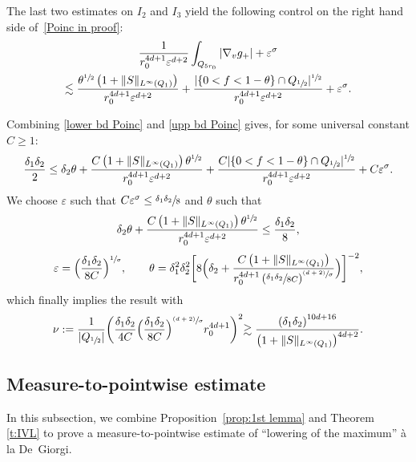 \documentclass[10pt]{amsart}
\newcommand{\psfrac}[2]{\sfrac{(#1)}{#2}}
\theoremstyle{definition}
\theoremstyle{remark}
\let\var\varepsilon
\begin{document}
The last two estimates on $I_2$ and $I_3$ yield the following
control on the right hand side of~\eqref{Poinc in proof}:
\begin{multline}
\label{upp bd Poinc}
\frac{1}{r_0^{4d+1} \varepsilon^{d+2}}
\int_{Q_{5r_0}} |\nabla_v g_+| +
\varepsilon^\sigma\\
\lesssim
\frac{\theta^{\sfrac12}\left(1+\|S\|_{L^\infty(Q_1)}\right)}{r_0^{4d+1}
\varepsilon^{d+2}}
+ \frac{|\{0<f<1-\theta\}\cap
Q_{\sfrac12}|^{\sfrac12}}{r_0^{4d+1}\varepsilon^{d+2}}
+ \varepsilon^\sigma.
\end{multline}

Combining \eqref{lower bd Poinc} and \eqref{upp bd Poinc} gives,
for some universal constant $C\geq 1$:
\begin{equation}
\label{estim finale}
\frac{\delta_1 \delta_2}{2} \le \delta_2 \theta +
\frac{C\left(1+\|S\|_{L^\infty(Q_1)} \right)
\theta^{\sfrac12}}{r_0^{4d+1} \varepsilon^{d+2}}
+ \frac{C|\{0<f<1-\theta\}\cap
Q_{\sfrac12}|^{\sfrac12}}{r_0^{4d+1} \var^{d+2}} + C \varepsilon^\sigma.
\end{equation}
We choose $\varepsilon$ such that
$C\varepsilon^\sigma \leq \sfrac{\delta_1 \delta_2}{8}$ and
$\theta$ such that
\[
\delta_2 \theta + \frac{C\left(1+\|S\|_{L^\infty(Q_1)}\right)
\theta^{\sfrac12}}{r_0^{4d+1}\var^{d+2}} \leq \frac{\delta_1
\delta_2}{8},
\]
\eg
\begin{equation}
\label{eq:choice-theta}
\varepsilon=\Bigl(\frac{\delta_1\delta_2}{8C}\Bigr)^{\sfrac{1}{\sigma}},
\qquad
\theta= \delta_1^2 \delta_2^2 \biggl[ 8\Bigl( \delta_2 +
\frac{C\left(1+\|S\|_{L^\infty(Q_1)}\right)}{r_0^{4d+1} \left(
\sfrac{\delta_1\delta_2}{8C}
\right)^{\psfrac{d+2}{\sigma}}}\Bigr) \biggr]^{-2},
\end{equation}
which finally implies the result with
\begin{equation}
\label{eq:choice-nu}
\nu:= \frac{1}{|Q_{\sfrac12}|}\biggl(\frac{\delta_1\delta_2}{4C}
\Bigl(\frac{\delta_1\delta_2}{8C}\Bigr)^{\psfrac{d+2}{\sigma}}
r_0^{4d+1}\biggl)^2 \gtrsim
\frac{\left( \delta_1 \delta_2
\right)^{10d+16}}{\left(1+\|S\|_{L^\infty(Q_1)}\right)^{4d+2}}.
\end{equation}

\subsection{Measure-to-pointwise estimate}
\label{ss:m2p}

In this subsection, we combine Proposition~\ref{prop:1st lemma}
and Theorem \ref{t:IVL} to prove a measure-to-pointwise estimate
of ``lowering of the maximum'' à la De~Giorgi.
\end{document}
